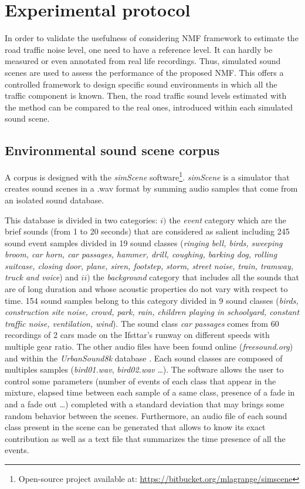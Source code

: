 \documentclass[twocolumn,a4paper,10pt]{article}
\begin{document}
\section{Experimental protocol}\label{part:protocol}

In order to validate the usefulness of considering NMF framework to estimate the road traffic noise level, one need to have a reference level. It can hardly be measured or even annotated from real life recordings. Thus,  simulated sound scenes are used to assess the performance of the proposed NMF. This offers a controlled framework to design specific sound environments in which all the traffic component is known. Then, the road traffic sound levels estimated with the method can be compared to the real ones, introduced within each simulated sound scene.

\subsection{Environmental sound scene corpus}

A corpus is designed with the \textit{simScene} software\footnote{Open-source project available at: \url{https://bitbucket.org/mlagrange/simscene}}. \textit{simScene} \cite{rossignol_simscene:_2015} is a simulator that creates sound scenes in a .wav format by summing audio samples that come from an isolated sound database. 

This database is divided in two categories: $i)$ the \textit{event} category which are the brief sounds (from 1 to 20 seconds) that are considered as salient including 245 sound event samples divided in 19 sound classes (\textit{ringing bell, birds, sweeping broom, car horn, car passages, hammer, drill, coughing, barking dog, rolling suitcase, closing door, plane, siren, footstep, storm, street noise, train, tramway, truck and voice}) and $ii)$ the \textit{background} category that includes all the sounds that are of long duration and whose acoustic properties do not vary with respect to time. 154 sound samples belong to this category divided in 9 sound classes (\textit{birds, construction site noise, crowd, park, rain, children playing in schoolyard, constant traffic noise, ventilation, wind}). The sound class \textit{car passages} comes from 60 recordings of 2 cars made on the Ifsttar's runway on different speeds with multiple gear ratio. The other audio files have been found online (\textit{freesound.org}) and within the \textit{UrbanSound8k} database \cite{salamon_dataset_nodate}. Each sound classes are composed of multiples samples (\textit{bird01.wav}, \textit{bird02.wav} \dots). 
The software allows the user to control some parameters (number of events of each class that appear in the mixture, elapsed time between each sample of a same class, presence of a fade in and a fade out \dots) completed with a standard deviation that may brings some random behavior between the scenes. Furthermore, an audio file of each sound class present in the scene can be generated that allows to know its exact contribution as well as a text file that summarizes the time presence of all the events.\\
\end{document}
